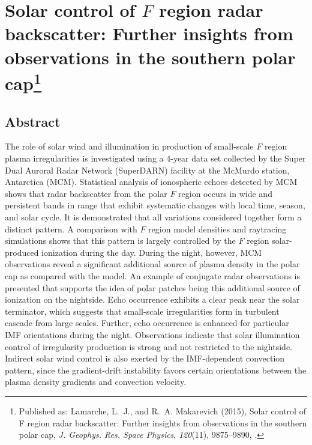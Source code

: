 
\chapter[Solar control of \(F\) region radar backscatter: Further insights from observations in the southern polar cap]{Solar control of \(F\) region radar backscatter: Further insights from observations in the southern polar cap\footnote{Published as: {Lamarche}, L.~J., and R.~A. {Makarevich} (2015), Solar control of {F} region radar backscatter: Further insights from observations in the southern polar cap, \textit{J. Geophys. Res. Space Physics}, \textit{120}(11), 9875--9890, .}}


\label{sec:paper1}



\section*{Abstract}
The role of solar wind and illumination in production of small-scale \(F\) region plasma irregularities is investigated using a 4-year data set collected by the Super Dual Auroral Radar Network (SuperDARN) facility at the McMurdo station, Antarctica (MCM). Statistical analysis of ionospheric echoes detected by MCM shows that radar backscatter from the polar \(F\) region occurs in wide and persistent bands in range that exhibit systematic changes with local time, season, and solar cycle. It is demonstrated that all variations considered together form a distinct pattern. A comparison with \(F\) region model densities and raytracing simulations shows that this pattern is largely controlled by the \(F\) region solar-produced ionization during the day. During the night, however, MCM observations reveal a significant additional source of plasma density in the polar cap as compared with the model. An example of conjugate radar observations is presented that supports the idea of polar patches being this additional source of ionization on the nightside. Echo occurrence exhibits a clear peak near the solar terminator, which suggests that small-scale irregularities form in turbulent cascade from large scales. Further, echo occurrence is enhanced for particular IMF orientations during the night. Observations indicate that solar illumination control of irregularity production is strong and not restricted to the nightside. Indirect solar wind control is also exerted by the IMF-dependent convection pattern, since the gradient-drift instability favors certain orientations between the plasma density gradients and convection velocity.


